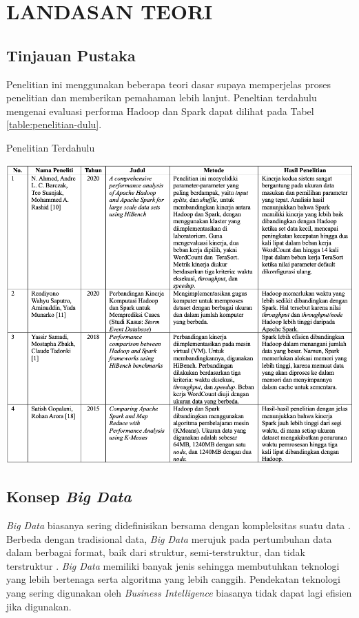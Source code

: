\chapter{LANDASAN TEORI}

\section{Tinjauan Pustaka}
Penelitian ini menggunakan beberapa teori dasar supaya memperjelas proses penelitian dan memberikan pemahaman lebih lanjut. Peneltian terdahulu mengenai evaluasi performa Hadoop dan Spark dapat dilihat pada Tabel \ref{table:penelitian-dulu}.

\begin{table}[h]
  \centering
  \caption{Penelitian Terdahulu}
  \includegraphics[width=1\textwidth]{figures/ch02/comparison-thesis}
  \label{table:penelitian-dulu}
\end{table}

\section{Konsep \textit{Big Data}}
\textit{Big Data} biasanya sering didefinisikan bersama dengan kompleksitas suatu data \cite{barosenAnalysisComparisonInterfacing2018}. Berbeda dengan tradisional data, \textit{Big Data} merujuk pada pertumbuhan data dalam berbagai format, baik dari struktur, semi-terstruktur, dan tidak terstruktur \cite{oussousBigDataTechnologies2018}. \textit{Big Data} memiliki banyak jenis sehingga membutuhkan teknologi yang lebih bertenaga serta algoritma yang lebih canggih. Pendekatan teknologi yang sering digunakan oleh \textit{Business Intelligence} biasanya tidak dapat lagi efisien jika digunakan.

